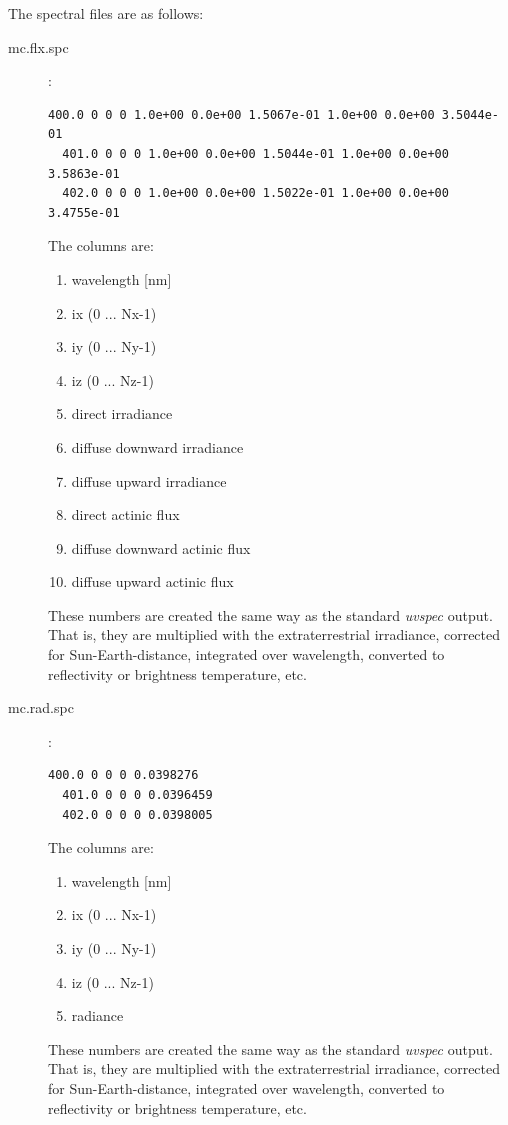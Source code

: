 The spectral files are as follows:
\begin{description}
 \item[mc.flx.spc]
   :
  \begin{Verbatim}[fontsize=\footnotesize, frame=single, samepage=true]
  400.0 0 0 0 1.0e+00 0.0e+00 1.5067e-01 1.0e+00 0.0e+00 3.5044e-01
  401.0 0 0 0 1.0e+00 0.0e+00 1.5044e-01 1.0e+00 0.0e+00 3.5863e-01
  402.0 0 0 0 1.0e+00 0.0e+00 1.5022e-01 1.0e+00 0.0e+00 3.4755e-01
  \end{Verbatim}

  The columns are:
  \begin{enumerate}
  \item  wavelength [nm]
  \item  ix (0 ... Nx-1)
  \item  iy (0 ... Ny-1)
  \item  iz (0 ... Nz-1)
  \item  direct irradiance
  \item  diffuse downward irradiance
  \item  diffuse upward irradiance
  \item  direct actinic flux
  \item  diffuse downward actinic flux
  \item  diffuse upward actinic flux
  \end{enumerate}
  These numbers are created the same way as the standard {\sl uvspec} output. That
  is, they are multiplied with the extraterrestrial irradiance, corrected for
  Sun-Earth-distance, integrated over wavelength, converted to reflectivity or 
  brightness temperature, etc. 

 \item[mc.rad.spc]
   :
  \begin{Verbatim}[fontsize=\footnotesize, frame=single, samepage=true]
  400.0 0 0 0 0.0398276
  401.0 0 0 0 0.0396459
  402.0 0 0 0 0.0398005
  \end{Verbatim}

  The columns are:
  \begin{enumerate}
  \item  wavelength [nm]
  \item  ix (0 ... Nx-1)
  \item  iy (0 ... Ny-1)
  \item  iz (0 ... Nz-1)
  \item  radiance 
  \end{enumerate}
  These numbers are created the same way as the standard {\sl uvspec}
  output. That is, they are multiplied with the extraterrestrial irradiance,
  corrected for Sun-Earth-distance, integrated over wavelength, converted to
  reflectivity or brightness temperature, etc. 


\end{description}

